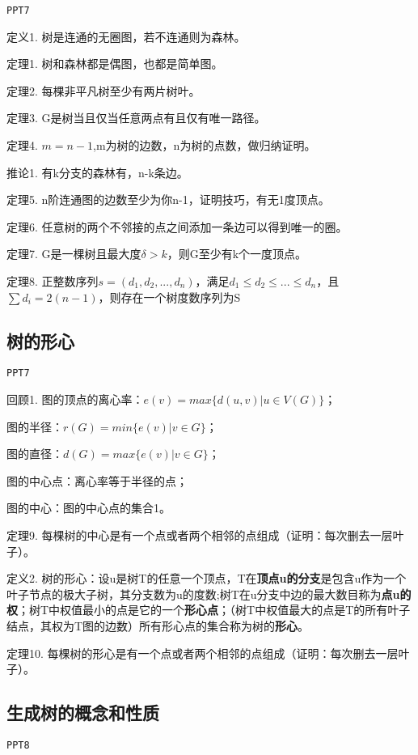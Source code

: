 \documentclass{article}
\begin{document}
\texttt{PPT7}

定义1. 树是连通的无圈图，若不连通则为森林。

定理1. 树和森林都是偶图，也都是简单图。

定理2. 每棵非平凡树至少有两片树叶。

定理3. G是树当且仅当任意两点有且仅有唯一路径。

定理4. $m = n - 1$,m为树的边数，n为树的点数，做归纳证明。

推论1. 有k分支的森林有，n-k条边。

定理5. n阶连通图的边数至少为你n-1，证明技巧，有无1度顶点。

定理6. 任意树的两个不邻接的点之间添加一条边可以得到唯一的圈。

定理7. G是一棵树且最大度$\delta > k$，则G至少有k个一度顶点。

定理8. 正整数序列$s = (d_1,d_2,...,d_n)$，满足$d_1 \le d_2 \le ... \le d_n$，且$\sum d_i = 2(n-1)$，则存在一个树度数序列为S

\subsection{树的形心}

\texttt{PPT7}

回顾1. 图的顶点的离心率：$e(v) = max\{d(u,v)|u \in V(G)\}$；

\quad 图的半径：$r(G) = min\{e(v) | v \in G\}$；

\quad 图的直径：$d(G) = max\{e(v) | v \in G\}$；

\quad 图的中心点：离心率等于半径的点；

\quad 图的中心：图的中心点的集合1。

定理9. 每棵树的中心是有一个点或者两个相邻的点组成（证明：每次删去一层叶子）。

定义2. 树的形心：设u是树T的任意一个顶点，T在\textbf{顶点u的分支}是包含u作为一个叶子节点的极大子树，其分支数为u的度数;树T在u分支中边的最大数目称为\textbf{点u的权}；树T中权值最小的点是它的一个\textbf{形心点}；（树T中权值最大的点是T的所有叶子结点，其权为T图的边数）所有形心点的集合称为树的\textbf{形心}。

定理10. 每棵树的形心是有一个点或者两个相邻的点组成（证明：每次删去一层叶子）。

\subsection{生成树的概念和性质}

\texttt{PPT8}
\end{document}
